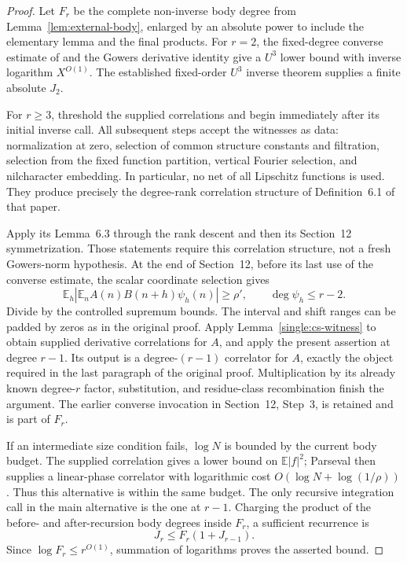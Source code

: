 \documentclass[11pt,a4paper]{article}
\theoremstyle{definition}
\newcommand{\E}{\mathbb E}
\begin{document}
\begin{proof}
Let \(F_r\) be the complete non-inverse body degree from
Lemma~\ref{lem:external-body}, enlarged by an absolute power to
include the elementary lemma and the final products. For \(r=2\),
the fixed-degree converse estimate of \cite[Lemma B.5]{lss} and
the Gowers derivative identity give a \(U^3\) lower bound with
inverse logarithm \(X^{O(1)}\). The established fixed-order
\(U^3\) inverse theorem supplies a finite absolute \(J_2\).

For \(r\ge3\), threshold the supplied correlations and begin
\cite[Lemma 6.2]{lss} immediately after its initial inverse call.
All subsequent steps accept the witnesses as data: normalization
at zero, selection of common structure constants and filtration,
selection from the fixed function partition, vertical Fourier
selection, and nilcharacter embedding. In particular, no net of
all Lipschitz functions is used. They produce precisely the
degree-rank correlation structure of Definition~6.1 of that paper.

Apply its Lemma~6.3 through the rank descent and then its
Section~12 symmetrization. Those statements require this correlation
structure, not a fresh Gowers-norm hypothesis. At the end of
Section~12, before its last use of the converse estimate, the scalar
coordinate selection gives
\[
 \E_h\left|\E_n A(n)B(n+h)\psi_h(n)\right|\ge\rho',
 \qquad \deg\psi_h\le r-2.
\]
Divide by the controlled supremum bounds. The interval and shift
ranges can be padded by zeros as in the original proof. Apply
Lemma~\ref{single:cs-witness} to obtain supplied derivative
correlations for \(A\), and apply the present assertion at
degree \(r-1\). Its output is a degree-\((r-1)\) correlator
for \(A\), exactly the object required in the last paragraph of
the original proof. Multiplication by its already known degree-\(r\)
factor, substitution, and residue-class recombination finish the
argument. The earlier converse invocation in Section~12, Step~3,
is retained and is part of \(F_r\).

If an intermediate size condition fails, \(\log N\) is bounded
by the current body budget. The supplied correlation gives a lower
bound on \(\E|f|^2\); Parseval then supplies a linear-phase
correlator with logarithmic cost \(O(\log N+\log(1/\rho))\).
Thus this alternative is within the same budget. The only recursive
integration call in the main alternative is the one at \(r-1\).
Charging the product of the before- and after-recursion body degrees
inside \(F_r\), a sufficient recurrence is
\[
 J_r\le F_r(1+J_{r-1}).
\]
Since \(\log F_r\le r^{O(1)}\), summation of logarithms
proves the asserted bound.
\end{proof}
\end{document}
